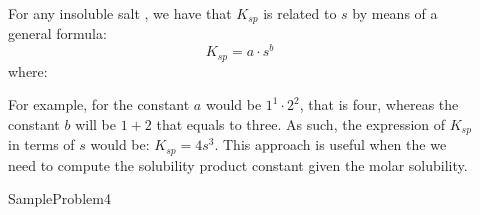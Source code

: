 \documentclass[main.tex]{subfiles}
\newcommand\chapterlabel{Ch-solubility}\setcounter{figurenewcounter}{0}\setcounter{tablenewcounter}{0}\setcounter{formulanewcounter}{0}
\begin{document}
\begin{description}
\item[] For any insoluble salt , we have that $K_{sp}$ is related to $s$ by means of a general formula:
\begin{equation}
\boxed{ K_{sp}= a\cdot s^b  }\label{\chapterlabel:equation2}
\end{equation}
where:
For example, for  the constant $a$ would be $1^1\cdot 2^2$, that is four, whereas the constant $b$ will be $1+2$ that equals to three. As such, the expression of $K_{sp}$ in terms of $s$ would be: $K_{sp}=4s^3$. This approach is useful when the we need to compute the solubility product constant given the molar solubility.

  {SampleProblem4}



\end{description}
\end{document}

